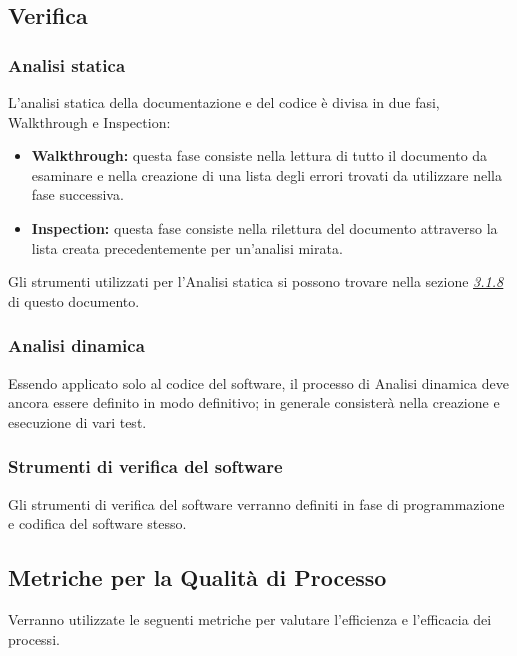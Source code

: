 	\subsection{Verifica}
		\subsubsection{Analisi statica}
			L'analisi statica della documentazione e del codice è divisa in due fasi, Walkthrough e Inspection:
			\begin{itemize}
				\item \textbf{Walkthrough:} questa fase consiste nella lettura di tutto il documento da esaminare e nella creazione di una lista degli errori trovati da utilizzare nella fase successiva.
				\item \textbf{Inspection:} questa fase consiste nella rilettura del documento attraverso la lista creata precedentemente per un'analisi mirata. \newline
			\end{itemize}
		Gli strumenti utilizzati per l'Analisi statica si possono trovare nella sezione \hyperref[3.1.8]{\textit{\underline{3.1.8}}} di questo documento.\newline
		\subsubsection{Analisi dinamica}
			Essendo applicato solo al codice del software, il processo di Analisi dinamica deve ancora essere definito in modo definitivo; in generale consisterà nella creazione e esecuzione di vari test.\newline
		\subsubsection{Strumenti di verifica del software}
		Gli strumenti di verifica del software verranno definiti in fase di programmazione e codifica del software stesso.\newline
		
	\subsection{Metriche per la Qualità di Processo}
	Verranno  utilizzate  le  seguenti  metriche  per  valutare  l’efficienza  e  l’efficacia  dei processi.
